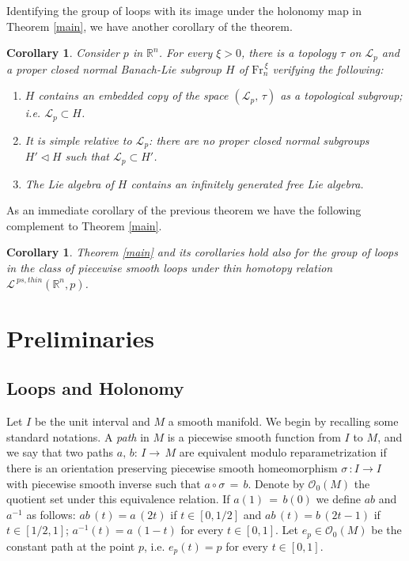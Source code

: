 \documentclass{amsart}
\newcommand{\R}{{\mathbb R}}
\newcommand{\I}{{\mathcal{O}}}
\newtheorem{corollary}[theorem]{Corollary}
\begin{document}
Identifying the group of loops with its image under the holonomy map in Theorem \ref{main}, we have another corollary of the theorem.


\begin{corollary}\label{Lie_group_generated}
Consider $p$ in $\R^n$. For every $\xi>0$, there is a topology $\tau$ on $\mathcal{L}_p$ and a proper closed normal Banach-Lie subgroup $H$ of $\mbox{Fr}_n^{\,\xi}$ verifying the following:
\begin{enumerate}
\item $H$ contains an embedded copy of the space $(\mathcal{L}_p,\,\tau)$ as a topological subgroup; i.e. $\mathcal{L}_p\subset H$.
\item It is \textit{simple relative to} $\mathcal{L}_p$: there are no proper closed normal subgroups $H'\lhd H$ such that $\mathcal{L}_p\subset H'$.
\item The Lie algebra of $H$ contains an infinitely generated free Lie algebra.
\end{enumerate}
\end{corollary}


As an immediate corollary of the previous theorem we have the following complement to Theorem \ref{main}.

\begin{corollary}
Theorem \ref{main} and its corollaries hold also for the group of loops in the class of piecewise smooth loops under thin homotopy relation $\mathcal{L}^{\ ps,thin}(\R^n,p)$.
\end{corollary}




\section{Preliminaries}\label{s.prelim}


\subsection{Loops and Holonomy}

Let $I$ be the unit interval and $M$ a smooth manifold. We begin by recalling some standard notations. A {\em path} in $M$ is a piecewise smooth function from $I$ to $M$, and we say that two paths $a,\,b:\,I \rightarrow\, M$ are equivalent modulo
reparametrization if there is an orientation preserving piecewise smooth homeomorphism $\sigma\,:I\rightarrow I$ with piecewise smooth inverse such that $a\circ \sigma\,=\,b$.  
Denote by $\I_0(M)$ the quotient set under this equivalence relation. If $a(1)\,=\,b(0)$ we define $ab$ and $a^{-1}$ as follows: $ab\,(t)=a\,(2t)$ if $t\in [0,1/2]$ and $ab\,(t)=b\,(2t-1)$ if $t\in [1/2,1]$; $a^{-1}(t) = a\,(1-t)$ for every $t\in [0,1]$. Let
$e_p \in \I_0(M)$ be the constant path at the point $p$, i.e. $e_p(t) =p$ for every $t\in [0,1]$.
\end{document}
